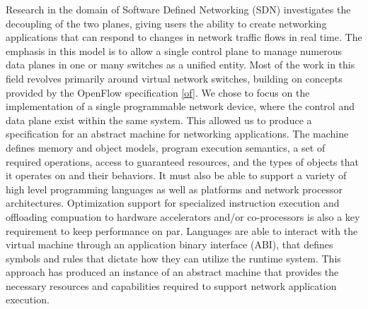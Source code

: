 Research in the domain of Software Defined Networking (SDN) investigates the decoupling of the two planes, giving users the ability to create networking applications that can respond to changes in network traffic flows in real time. The emphasis in this model is to allow a single control plane to manage numerous data planes in one or many switches as a unified entity. Most of the work in this field revolves primarily around virtual network switches, building on concepts provided by the OpenFlow specification \ref{of}. We chose to focus on the implementation of a single programmable network device, where the control and data plane exist within the same system. This allowed us to produce a specification for an abstract machine for networking applications. The machine defines memory and object models, program execution semantics, a set of required operations, access to guaranteed resources, and the types of objects that it operates on and their behaviors. It must also be able to support a variety of high level programming languages as well as platforms and network processor architectures. Optimization support for specialized instruction execution and offloading compuation to hardware accelerators and/or co-processors is also a key requirement to keep performance on par. Languages are able to interact with the virtual machine through an application binary interface (ABI), that defines symbols and rules that dictate how they can utilize the runtime system. This approach has produced an instance of an abstract machine that provides the necessary resources and capabilities required to support network application execution.




